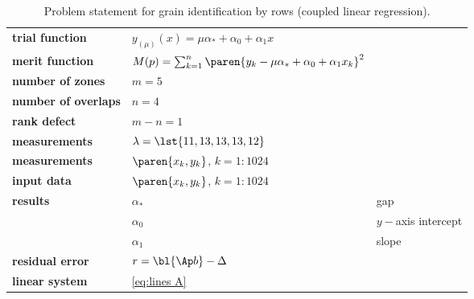   \begin{table}[t]  %
    \caption{Problem statement for grain identification by rows (coupled linear regression).}
    \begin{center}
      \begin{tabular}{lll}
        \bf{trial function} & $y_{(\mu)}(x) = \mu \alpha_{*} + \alpha_{0} + \alpha_{1} x$ \\
        \bf{merit function} & $M(p) = \sum_{k=1}^{n}\paren{y_{k} - \mu \alpha_{*} + \alpha_{0} + \alpha_{1} x_{k}}^{2}$ \\
        \bf{number of zones}& $m = 5$ \\
        \bf{number of overlaps}& $n = 4$ \\
        \bf{rank defect}    & $m - n  = 1$ \\
        \bf{measurements}   & $\lambda = \lst{11, 13, 13, 13, 12}$ \\
        \bf{measurements}   & $\paren{x_{k}, y_{k}}$, $k=1\colon 1024$ \\
        \bf{input data}     & $\paren{x_{k}, y_{k}}$, $k=1\colon 1024$ \\
        \bf{results}        & $\alpha_{*}$ & gap\\
                            & $\alpha_{0}$ & $y-$axis intercept\\
                            & $\alpha_{1}$ & slope\\
        \bf{residual error} & $r = \bl{\Ap b} - \Delta$ \\
        \bf{linear system}  & \eqref{eq:lines A} \\
      \end{tabular}
    \end{center}
  \label{tab:find lines problem statement}
  \end{table}%

